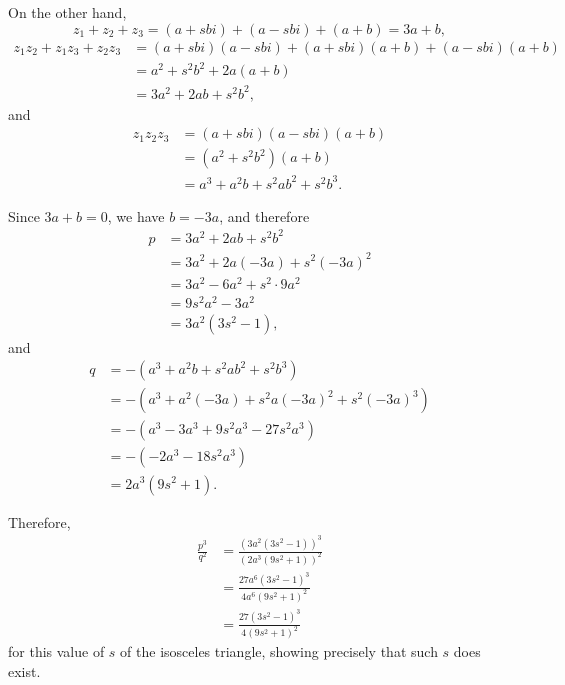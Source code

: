 \begin{enumerate}
          On the other hand,
          \[
              z_1 + z_2 + z_3 = (a + sbi) + (a - sbi) + (a + b) = 3a + b,
          \]
          \begin{align*}
              z_1 z_2 + z_1 z_3 + z_2 z_3 & = (a + sbi) (a - sbi) + (a + sbi) (a + b) + (a - sbi) (a + b) \\
                                          & = a^2 + s^2 b^2 + 2a (a + b)                                  \\
                                          & = 3a^2 + 2ab + s^2 b^2,
          \end{align*}
          and
          \begin{align*}
              z_1 z_2 z_3 & = (a + sbi) (a - sbi) (a + b)        \\
                          & = (a^2 + s^2 b^2) (a + b)            \\
                          & = a^3 + a^2 b + s^2 a b^2 + s^2 b^3.
          \end{align*}

          Since \(3a + b = 0\), we have \(b = -3a\), and therefore
          \begin{align*}
              p & = 3a^2 + 2ab + s^2 b^2          \\
                & = 3a^2 + 2a (-3a) + s^2 (-3a)^2 \\
                & = 3a^2 - 6a^2 + s^2 \cdot 9a^2  \\
                & = 9 s^2 a^2 - 3 a^2             \\
                & = 3a^2 \left(3s^2 - 1\right),
          \end{align*}
          and
          \begin{align*}
              q & = - \left(a^3 + a^2 b + s^2 a b^2 + s^2 b^3\right)             \\
                & = - \left(a^3 + a^2 (-3a) + s^2 a (-3a)^2 + s^2 (-3a)^3\right) \\
                & = - \left(a^3 - 3a^3 + 9 s^2 a^3 - 27 s^2 a^3\right)           \\
                & = - \left(-2 a^3 - 18 s^2 a^3\right)                           \\
                & = 2a^3 \left(9 s^2 + 1\right).
          \end{align*}

          Therefore,
          \begin{align*}
              \frac{p^3}{q^2} & = \frac{\left(3a^2 \left(3s^2 - 1\right)\right)^3}{\left(2a^3 \left(9 s^2 + 1\right)\right)^2} \\
                              & = \frac{27 a^6 \left(3s^2 - 1\right)^3}{4 a^6 \left(9 s^2 + 1\right)^2}                        \\
                              & = \frac{27 \left(3s^2 - 1\right)^3}{4 \left(9 s^2 + 1\right)^2}
          \end{align*}
          for this value of \(s\) of the isosceles triangle, showing precisely that such \(s\) does exist.


\end{enumerate}
